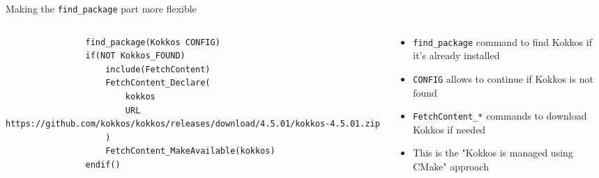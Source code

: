 \documentclass[
    aspectratio=169,
]{beamer}
\begin{document}
\begin{frame}[fragile]{Making the \texttt{find\_package} part more flexible}
    \begin{columns}
        \begin{column}{0.6\linewidth}
            \begin{verbatim}
                find_package(Kokkos CONFIG)
                if(NOT Kokkos_FOUND)
                    include(FetchContent)
                    FetchContent_Declare(
                        kokkos
                        URL https://github.com/kokkos/kokkos/releases/download/4.5.01/kokkos-4.5.01.zip
                    )
                    FetchContent_MakeAvailable(kokkos)
                endif()
            \end{verbatim}
        \end{column}
        \begin{column}{0.4\linewidth}
            \begin{itemize}
                \item \texttt{find\_package} command to find Kokkos if it's already installed
                \item \texttt{CONFIG} allows to continue if Kokkos is not found
                \item \texttt{FetchContent\_*} commands to download Kokkos if needed
                \item This is the "Kokkos is managed using CMake" approach
            \end{itemize}
        \end{column}
    \end{columns}
\end{frame}

\end{document}
